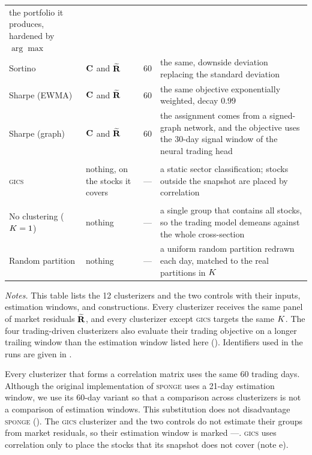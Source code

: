 \begin{table}[htbp]
\begin{threeparttable}
\begin{tabular}{@{}l>{\raggedright\arraybackslash}p{2.6cm}c>{\raggedright\arraybackslash}p{4.65cm}@{}}
    the portfolio it produces, hardened by $\arg\max$ \\
Sortino & $\mathbf{C}$ and $\widetilde{\mathbf{R}}$ & $60$
  & the same, downside deviation replacing the standard deviation \\
Sharpe (EWMA) & $\mathbf{C}$ and $\widetilde{\mathbf{R}}$ & $60$
  & the same objective exponentially weighted, decay $0.99$\tnote{d} \\
Sharpe (graph) & $\mathbf{C}$ and $\widetilde{\mathbf{R}}$ & $60$
  & the assignment comes from a signed-graph network, and the objective uses the 30-day signal window of the neural trading head \\
\addlinespace
\multicolumn{4}{@{}l}{\emph{Taxonomy} \citep{bhojraj2003whats}}\\
\textsc{gics} & nothing, on the stocks it
  covers & --- & a static sector classification; stocks outside the snapshot are placed by correlation\tnote{e} \\
\addlinespace
\midrule
\multicolumn{4}{@{}l}{\emph{Controls}}\\
No clustering ($K=1$) & nothing & ---
  & a single group that contains all stocks, so the trading model demeans against the whole
    cross-section \\
Random partition & nothing & ---
  & a uniform random partition redrawn each day, matched to the real partitions in $K$ \\
\bottomrule
\end{tabular}
\begin{tablenotes}[flushleft]\footnotesize
\item \emph{Notes.} This table lists the 12 clusterizers and the two controls with their inputs, estimation windows, and constructions. Every clusterizer receives the same panel of market residuals $\widetilde{\mathbf{R}}$, and every clusterizer except \textsc{gics} targets the
same $K$. The four trading-driven clusterizers also evaluate their trading objective on a longer trailing window than the estimation window listed here (). Identifiers used in the runs are given in .
\item[a] Every clusterizer that forms a correlation matrix uses the same
60 trading days. Although the original implementation of \textsc{sponge} uses a 21-day
estimation window, we use its 60-day variant so that a comparison across clusterizers is not a comparison of estimation windows.
This substitution does not disadvantage \textsc{sponge}
(). The \textsc{gics} clusterizer and the two controls do not estimate their groups from market residuals, so their estimation window is marked ---. \textsc{gics} uses correlation only to place the stocks that its snapshot does not cover (note e).

\end{tablenotes}
\end{threeparttable}
\end{table}
